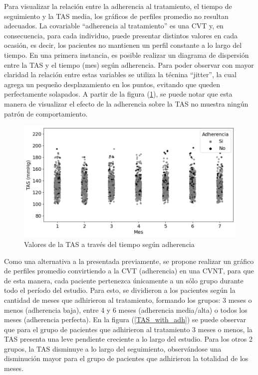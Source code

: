 \documentclass[spanish]{article}
\numberwithin{figure}{subsection}
\numberwithin{equation}{subsection}
\numberwithin{table}{subsection}
\begin{document}
Para visualizar la relación entre la adherencia al tratamiento, el tiempo de
seguimiento y la TAS media, los gráficos de perfiles promedio no resultan
adecuados. La covariable ``adherencia al tratamiento'' es una CVT y, en
consecuencia, para cada individuo, puede presentar distintos valores en cada
ocasión, es decir, los pacientes no mantienen un perfil constante a lo largo del
tiempo. En una primera instancia, es posible realizar un diagrama de dispersión
entre la TAS y el tiempo (mes) según adherencia. Para poder observar con mayor
claridad la relación entre estas variables se utiliza la técnina ``jitter'', la
cual agrega un pequeño desplazamiento en los puntos, evitando que queden
perfectamente solapados. A partir de la figura (\ref{TAS_with_adh_scatter}), se
puede notar que esta manera de visualizar el efecto de la adherencia sobre la
TAS no muestra ningún patrón de comportamiento.

\begin{figure}[H]
	\centering
	\includegraphics[scale=0.5]{img/TAS_vs_tpo_with_adherencia_scatter.png}
	\caption{Valores de la TAS a través del tiempo según adherencia}
	\label{TAS_with_adh_scatter}
\end{figure}

Como una alternativa a la presentada previamente, se propone realizar un gráfico
de perfiles promedio convirtiendo a la CVT (adherencia) en una CVNT, para que de
esta manera, cada paciente pertenezca únicamente a un sólo grupo durante todo el
período del estudio. Para esto, se dividieron a los pacientes según la cantidad
de meses que adhirieron al tratamiento, formando los grupos: 3 meses o menos
(adherencia baja), entre 4 y 6 meses (adherencia media/alta) o todos los meses
(adherencia perfecta). En la figura (\ref{TAS_with_adh}) se puede observar que
para el grupo de pacientes que adhirieron al tratamiento 3 meses o menos, la TAS
presenta una leve pendiente creciente a lo largo del estudio. Para los otros 2
grupos, la TAS disminuye a lo largo del seguimiento, observándose una
disminución mayor para el grupo de pacientes que adhirieron la totalidad de los
meses.
\end{document}
